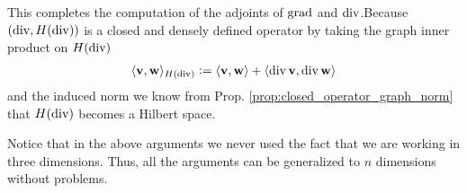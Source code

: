 \documentclass[../master_thesis.tex]{subfiles}
\begin{document}


This completes the computation of the adjoints of $\operatorname{grad}$ and $\operatorname{div}$.Because  
$(\operatorname{div}, H(\operatorname{div}))$ is a closed and densely defined operator 
by taking the graph inner product on $H(\operatorname{div})$
\begin{align*}
    \langle \mathbf{v}, \mathbf{w} \rangle _{H(\operatorname{div})}
    \vcentcolon= \langle \mathbf{v}, \mathbf{w} \rangle + \langle \operatorname{div} \mathbf{v}, \operatorname{div} \mathbf{w} \rangle
\end{align*}
and the induced norm
we know from Prop. \ref{prop:closed_operator_graph_norm} that $H(\operatorname{div})$ becomes a Hilbert space.

\begin{remark}
    Notice that in the above arguments 
    we never used the fact that we are working in three dimensions. Thus, 
    all the arguments can be generalized to $n$ dimensions without problems.
\end{remark}
\end{document}
